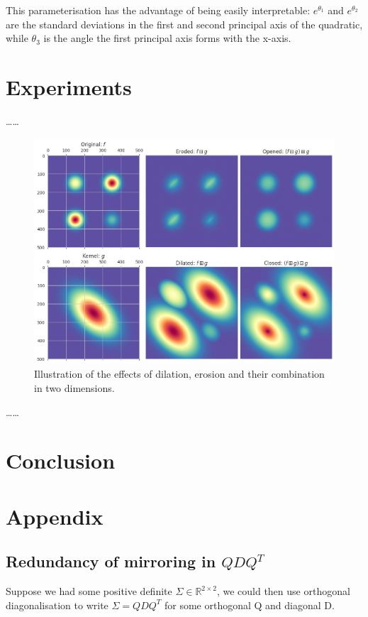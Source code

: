 \documentclass[a4paper, 12pt]{report}
\def\comment#1{\color{red}#1\color{black}}
\begin{document}
This parameterisation has the advantage of being easily interpretable: $e^{\theta_1}$ and $e^{\theta_2}$ are the standard deviations in the first and second principal axis of the quadratic, while $\theta_3$ is the angle the first principal axis forms with the x-axis.
\chapter{Experiments}
\comment{\ldots\ldots}
\begin{figure}[h!]
	\center
  \includegraphics[width=\textwidth]{figures/morphological_2d.png}
  \caption{Illustration of the effects of dilation, erosion and their combination in two dimensions.}
  \label{fig:dil-illust}
\end{figure}
\comment{\ldots\ldots}


\chapter{Conclusion}





\newpage
\chapter{Appendix}
\section{Redundancy of mirroring in $QDQ^T$}
\label{sec:red-mirr}
Suppose we had some positive definite $\Sigma \in \mathbb{R}^{2\times 2}$, we could then use orthogonal diagonalisation to write $\Sigma = QDQ^T$ for some orthogonal Q and diagonal D.
\end{document}
